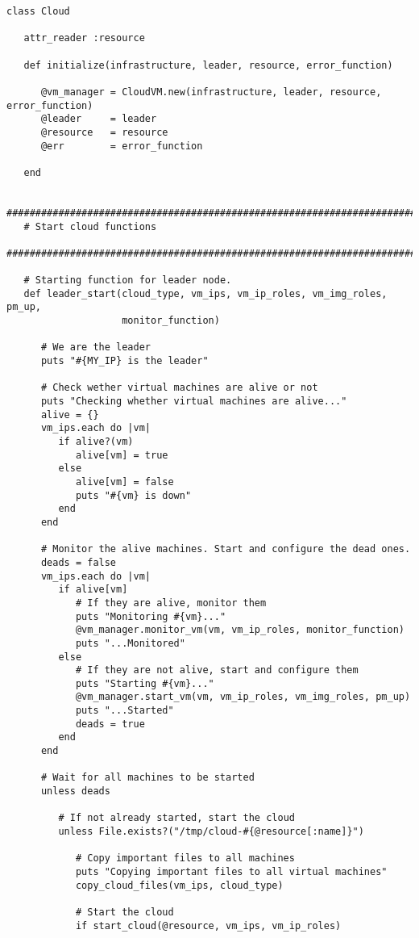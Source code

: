 \begin{lstlisting}
class Cloud

   attr_reader :resource

   def initialize(infrastructure, leader, resource, error_function)

      @vm_manager = CloudVM.new(infrastructure, leader, resource, error_function)
      @leader     = leader
      @resource   = resource
      @err        = error_function

   end

   #############################################################################
   # Start cloud functions
   #############################################################################

   # Starting function for leader node.
   def leader_start(cloud_type, vm_ips, vm_ip_roles, vm_img_roles, pm_up,
                    monitor_function)
      
      # We are the leader
      puts "#{MY_IP} is the leader"
      
      # Check wether virtual machines are alive or not
      puts "Checking whether virtual machines are alive..."
      alive = {}
      vm_ips.each do |vm|
         if alive?(vm)
            alive[vm] = true
         else
            alive[vm] = false
            puts "#{vm} is down"
         end
      end
      
      # Monitor the alive machines. Start and configure the dead ones.
      deads = false
      vm_ips.each do |vm|
         if alive[vm]
            # If they are alive, monitor them
            puts "Monitoring #{vm}..."
            @vm_manager.monitor_vm(vm, vm_ip_roles, monitor_function)
            puts "...Monitored"
         else
            # If they are not alive, start and configure them
            puts "Starting #{vm}..."
            @vm_manager.start_vm(vm, vm_ip_roles, vm_img_roles, pm_up)
            puts "...Started"
            deads = true
         end
      end
      
      # Wait for all machines to be started
      unless deads
      
         # If not already started, start the cloud
         unless File.exists?("/tmp/cloud-#{@resource[:name]}")
            
            # Copy important files to all machines
            puts "Copying important files to all virtual machines"
            copy_cloud_files(vm_ips, cloud_type)
         
            # Start the cloud
            if start_cloud(@resource, vm_ips, vm_ip_roles)
               

\end{lstlisting}
